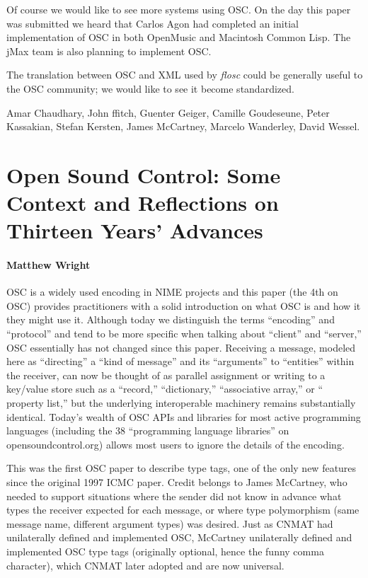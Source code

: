 Of course we would like to see more systems using OSC.  On the day this paper was submitted we heard that Carlos Agon had completed an initial implementation of OSC in both OpenMusic \cite{Agon:1999} and Macintosh Common Lisp. The jMax \cite{Dechelle:1999} team is also planning to implement OSC.

The translation between OSC and XML used by \textit{flosc} could be generally useful to the OSC community; we would like to see it become standardized.

\begin{acknowledgement}
Amar Chaudhary, John  ffitch, Guenter Geiger, Camille Goudeseune, Peter Kassakian, Stefan Kersten, James McCartney, Marcelo Wanderley, David Wessel.
\end{acknowledgement}


\section*{Open Sound Control: Some Context and Reflections on Thirteen Years' Advances}
\paragraph{Matthew Wright}

OSC is a widely used encoding in NIME projects and this paper (the 4th on OSC) provides practitioners with a solid introduction on what OSC is and how it they might use it. Although today we distinguish the terms ``encoding'' and ``protocol'' and tend to be more specific when talking about ``client'' and ``server,'' OSC essentially has not changed since this paper.  Receiving a message, modeled here as ``directing'' a ``kind of message'' and its ``arguments'' to ``entities'' within the receiver, can now be thought of as parallel assignment or writing to a key/value store such as a ``record,'' ``dictionary,'' ``associative array,'' or `` property list,'' but the underlying interoperable machinery remains substantially identical.  Today's wealth of OSC APIs and libraries for most active programming languages (including the 38 ``programming language libraries'' on opensoundcontrol.org) allows most users to ignore the details of the encoding.

This was the first OSC paper to describe type tags, one of the only new features since the original 1997 ICMC paper. Credit belongs to James McCartney, who needed to support situations where the sender did not know in advance what types the receiver expected for each message, or where type polymorphism (same message name, different argument types) was desired. Just as CNMAT had unilaterally defined and implemented OSC, McCartney unilaterally defined and implemented OSC type tags (originally optional, hence the funny comma character), which CNMAT later adopted and are now universal.

